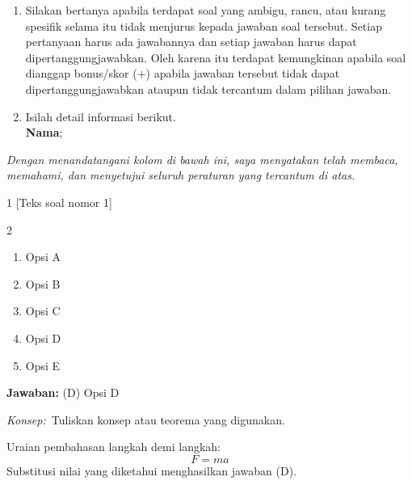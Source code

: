 \documentclass[11pt]{article}
\newcommand{\jawaban}[1]{%
  \noindent\colorbox{gold!30}{\parbox{\dimexpr\linewidth-2\fboxsep\relax}{%
    \textbf{Jawaban:} #1}}%
  \par\smallskip}
\newcommand{\konsep}{\noindent\textit{Konsep:}\ \ignorespaces}
\newenvironment{pilB}{%
  \par\smallskip
  \begin{multicols}{2}
  \begin{enumerate}[label=(\Alph*),leftmargin=*,itemsep=1pt,topsep=3pt]}%
  {\end{enumerate}\end{multicols}}
\begin{document}
\begin{enumerate}[leftmargin=*,itemsep=4pt,topsep=4pt]
  \item Silakan bertanya apabila terdapat soal yang ambigu, rancu, atau kurang
        spesifik selama itu tidak menjurus kepada jawaban soal tersebut. Setiap
        pertanyaan harus ada jawabannya dan setiap jawaban harus dapat
        dipertanggungjawabkan. Oleh karena itu terdapat kemungkinan apabila soal
        dianggap bonus/skor ($+$) apabila jawaban tersebut tidak dapat
        dipertanggungjawabkan ataupun tidak tercantum dalam pilihan jawaban.

  \item Isilah detail informasi berikut.\\[0.3em]
        \textbf{Nama}\hspace{0.45cm};\enspace\underline{\hspace{8cm}}
\end{enumerate}

\vspace{0.7cm}
\noindent\textit{Dengan menandatangani kolom di bawah ini, saya menyatakan telah membaca,
memahami, dan menyetujui seluruh peraturan yang tercantum di atas.}

\vspace{0.6cm}
\noindent{}

\clearpage


\begin{soal}{1}
[Teks soal nomor 1]
\begin{pilB}
  \item Opsi A \item Opsi B \item Opsi C \item Opsi D \item Opsi E
\end{pilB}
\end{soal}

\begin{pembox}
\jawaban{(D) Opsi D}
\konsep Tuliskan konsep atau teorema yang digunakan.

Uraian pembahasan langkah demi langkah:
\[
  F = ma
\]
Substitusi nilai yang diketahui menghasilkan jawaban (D).
\end{pembox}
\end{document}
